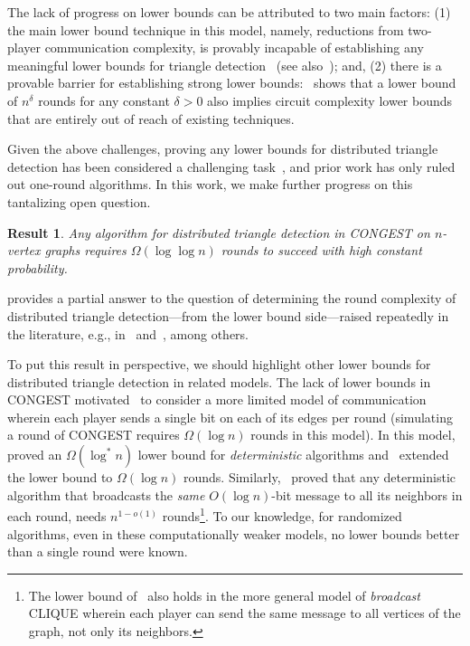\documentclass[11pt]{article}
\newtheorem{mdresult}{Result}
\newenvironment{result}{\begin{mdframed}[backgroundcolor=lightgray!40,topline=false,rightline=false,leftline=false,bottomline=false,innertopmargin=2pt]\begin{mdresult}}{\end{mdresult}\end{mdframed}}
\theoremstyle{definition}
\begin{document}
The lack of progress on lower bounds can be attributed to two main factors: 
(1) the main lower bound technique in this model, namely, reductions from
two-player communication complexity, is provably incapable of establishing any meaningful lower bounds for triangle detection~\cite{AbboudCKL20,FischerGKO18,CH22} (see also~); and, (2) there is a provable barrier for establishing 
strong lower bounds:~\cite{EdenFFKO22} shows that a lower bound of $n^{\delta}$ rounds for any constant $\delta > 0$ also implies circuit complexity lower bounds that are entirely out of reach of existing techniques. 


Given the above challenges, proving any lower bounds for distributed triangle detection has been considered a challenging task~\cite{AbboudCKL20,FischerGKO18,CH22}, and prior
work has only ruled out one-round algorithms. In this work, we make further progress on this tantalizing open question. 

\begin{result}\label{res:main}
	Any algorithm for distributed triangle detection in CONGEST on $n$-vertex graphs requires $\Omega(\log\log{n})$ rounds to succeed with high constant probability. 
\end{result}

 provides a partial answer to the question of determining the round complexity of distributed triangle detection---from the lower bound side---raised repeatedly in the literature, e.g., 
in~\cite[Open Question 1]{AbboudCKL20} and~\cite[Open Problem 2.2]{CH22}, among others. 

To put this result in perspective, we should highlight other lower bounds for distributed triangle detection in related models. The lack of lower bounds in CONGEST motivated~\cite{AbboudCKL20} to consider a more limited model of 
communication wherein each player sends a single bit on each of its edges per round (simulating a round of CONGEST requires $\Omega(\log{n})$ rounds in this model). In this model,~\cite{AbboudCKL20}
proved an $\Omega(\log^*\!{n})$ lower bound for \emph{deterministic} algorithms and~\cite{FischerGKO18} extended the lower bound to $\Omega(\log{n})$ rounds. 
Similarly,~\cite{DruckerKO14} proved that any deterministic algorithm that broadcasts the \emph{same} $O(\log{n})$-bit message to all its neighbors in each round, needs $n^{1-o(1)}$ rounds\footnote{The lower bound of~\cite{DruckerKO14} also holds
	in the more general model of \emph{broadcast} CLIQUE wherein each player can send the same message to all vertices of the graph, not only its neighbors.}. To our knowledge, for randomized algorithms, 
even in these computationally weaker models, no lower bounds better than a single round were known. 
\end{document}
